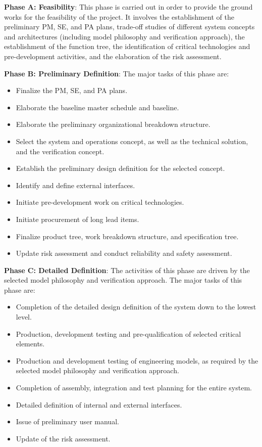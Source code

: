 \textbf{Phase A: Feasibility}: This phase is carried out in order to provide the ground works for the feasibility of the project. It involves the establishment of the preliminary PM, SE, and PA plans, trade-off studies of different system concepts and architectures (including model philosophy and verification approach), the establishment of the function tree, the identification of critical technologies and pre-development activities, and the elaboration of the risk assessment.

\textbf{Phase B: Preliminary Definition}: The major tasks of this phase are:
\begin{itemize}
\item Finalize the PM, SE, and PA plans.
\item Elaborate the baseline master schedule and baseline.
\item Elaborate the preliminary organizational breakdown structure.
\item Select the system and operations concept, as well as the technical solution, and the verification concept.
\item Establish the preliminary design definition for the selected concept.
\item Identify and define external interfaces.
\item Initiate pre-development work on critical technologies.
\item Initiate procurement of long lead items.
\item Finalize product tree, work breakdown structure, and specification tree.
\item Update risk assessment and conduct reliability and safety assessment.
\end{itemize}

\textbf{Phase C: Detailed Definition}: The activities of this phase are driven by the selected model philosophy and verification approach. The major tasks of this phase are:
\begin{itemize}
\item Completion of the detailed design definition of the system down to the lowest level.
\item Production, development testing and pre-qualification of selected critical elements.
\item Production and development testing of engineering models, as required
by the selected model philosophy and verification approach.
\item Completion of assembly, integration and test planning for the entire system.
\item Detailed definition of internal and external interfaces.
\item Issue of preliminary user manual.
\item Update of the risk assessment.
\end{itemize}

